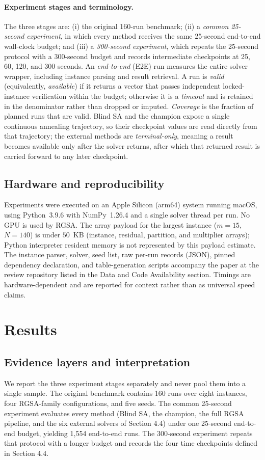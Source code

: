 \documentclass[11pt]{article}
\begin{document}
\paragraph{Experiment stages and terminology.} The three stages are: (i) the original 160-run benchmark; (ii) a \emph{common 25-second experiment}, in which every method receives the same 25-second end-to-end wall-clock budget; and (iii) a \emph{300-second experiment}, which repeats the 25-second protocol with a 300-second budget and records intermediate checkpoints at 25, 60, 120, and 300 seconds. An \emph{end-to-end} (E2E) run measures the entire solver wrapper, including instance parsing and result retrieval. A run is \emph{valid} (equivalently, \emph{available}) if it returns a vector that passes independent locked-instance verification within the budget; otherwise it is a \emph{timeout} and is retained in the denominator rather than dropped or imputed. \emph{Coverage} is the fraction of planned runs that are valid. Blind SA and the champion expose a single continuous annealing trajectory, so their checkpoint values are read directly from that trajectory; the external methods are \emph{terminal-only}, meaning a result becomes available only after the solver returns, after which that returned result is carried forward to any later checkpoint.

\subsection{Hardware and reproducibility}
Experiments were executed on an Apple Silicon (arm64) system running macOS, using Python~3.9.6 with NumPy~1.26.4 and a single solver thread per run. No GPU is used by RGSA. The array payload for the largest instance ($m{=}15$, $N{=}140$) is under $50$~KB (instance, residual, partition, and multiplier arrays); Python interpreter resident memory is not represented by this payload estimate. The instance parser, solver, seed list, raw per-run records (JSON), pinned dependency declaration, and table-generation scripts accompany the paper at the review repository listed in the Data and Code Availability section. Timings are hardware-dependent and are reported for context rather than as universal speed claims.

\section{Results}\label{sec:results}

\subsection{Evidence layers and interpretation}
We report the three experiment stages separately and never pool them into a single sample. The original benchmark contains 160 runs over eight instances, four RGSA-family configurations, and five seeds. The common 25-second experiment evaluates every method (Blind SA, the champion, the full RGSA pipeline, and the six external solvers of Section 4.4) under one 25-second end-to-end budget, yielding 1,554 end-to-end runs. The 300-second experiment repeats that protocol with a longer budget and records the four time checkpoints defined in Section 4.4.
\end{document}

